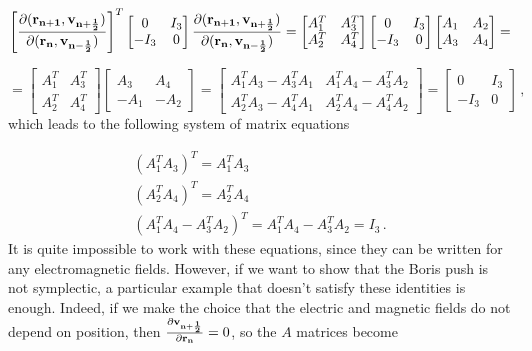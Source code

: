 \documentclass[12pt, class=report, crop=false]{standalone}
\begin{document}
\begin{equation*}
  \left[\pdv{(\vb{r_{n+1}}, \vb{v_{n+\frac{1}{2}}})}{(\vb{r_n}, \vb{v_{n-\frac{1}{2}}})}\right]^T
  \begin{bmatrix}
    0 & I_3\\
    -I_3 & 0
  \end{bmatrix}
  \pdv{(\vb{r_{n+1}}, \vb{v_{n+\frac{1}{2}}})}{(\vb{r_n}, \vb{v_{n-\frac{1}{2}}})} =
  \begin{bmatrix}
    A_1^T & A_3^T\\
    A_2^T & A_4^T
  \end{bmatrix}
  \begin{bmatrix}
    0 & I_3\\
    -I_3 & 0
  \end{bmatrix}
  \begin{bmatrix}
    A_1 & A_2\\
    A_3 & A_4
  \end{bmatrix} =
\end{equation*}

\begin{equation*}
  = \begin{bmatrix}
    A_1^T & A_3^T\\
    A_2^T & A_4^T
  \end{bmatrix}
  \begin{bmatrix}
    A_3 & A_4\\
    -A_1 & -A_2
  \end{bmatrix} =
  \begin{bmatrix}
    A_1^T A_3 - A_3^T A_1 & A_1^T A_4 - A_3^T A_2\\
    A_2^T A_3 - A_4^T A_1 & A_2^T A_4 - A_4^T A_2
  \end{bmatrix} =
  \begin{bmatrix}
    0 & I_3\\
    -I_3 & 0
  \end{bmatrix}\,,
\end{equation*}
which leads to the following system of matrix equations

\begin{subequations}
  \begin{align}
    \left(A_1^T A_3\right)^T = A_1^T A_3\\
    \left(A_2^T A_4\right)^T = A_2^T A_4\\
    \label{eq:111}
    \left(A_1^T A_4 - A_3^T A_2\right)^T = A_1^T A_4 - A_3^T A_2 = I_3\,.
  \end{align}
\end{subequations}
It is quite impossible to work with these equations, since they can be written for any electromagnetic fields. However, if we want to show that the Boris push is not symplectic, a particular example that doesn't satisfy these identities is enough. Indeed, if we make the choice that the electric and magnetic fields do not depend on position, then \(\pdv{\vb{v_{n+\frac{1}{2}}}}{\vb{r_n}} = 0\), so the \(A\) matrices become
\end{document}
